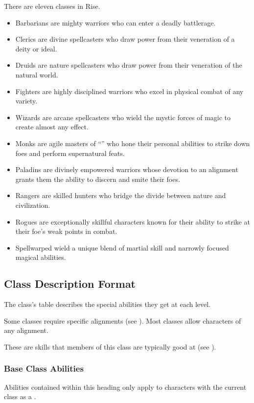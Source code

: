     There are eleven classes in Rise.
    \begin{itemize}
        \item Barbarians are mighty warriors who can enter a deadly battlerage.
        \item Clerics are divine spellcasters who draw power from their veneration of a deity or ideal.
        \item Druids are nature spellcasters who draw power from their veneration of the natural world.
        \item Fighters are highly disciplined warriors who excel in physical combat of any variety.
        \item Wizards are arcane spellcasters who wield the mystic forces of magic to create almost any effect.
        \item Monks are agile masters of ``\ki'' who hone their personal abilities to strike down foes and perform supernatural feats.
        \item Paladins are divinely empowered warriors whose devotion to an alignment grants them the ability to discern and smite their foes.
        \item Rangers are skilled hunters who bridge the divide between nature and civilization.
        \item Rogues are exceptionally skillful characters known for their ability to strike at their foe's weak points in combat.
        \item Spellwarped wield a unique blend of martial skill and narrowly focused magical abilities.
    \end{itemize}

    \subsection{Class Description Format}

        The class's table describes the special abilities they get at each level.

        Some classes require specific alignments (see ).
        Most classes allow characters of any alignment.

        These are skills that members of this class are typically good at (see ).

        \subsubsection{Base Class Abilities}
            Abilities contained within this heading only apply to characters with the current class as a .


